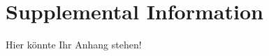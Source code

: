 \documentclass[
	12pt,
    a4paper,
    egregdoesnotlikesansseriftitles, %
    toc=chapterentrywithdots,
    oneside, openany,
    titlepage,
    parskip=half,
    headings=normal,  %
    listof=totoc,
    bibliography=totoc,
    index=totoc,
    captions=tableheading,  %
    listof=flat,
    numbers=noenddot, %
    final]
    {scrbook}
\begin{document}
\backmatter

\printnoidxglossaries


%

\clearpage %


\appendix
\chapter{Supplemental Information}\label{app:supplemental-information}
Hier könnte Ihr Anhang stehen!


\end{document}
